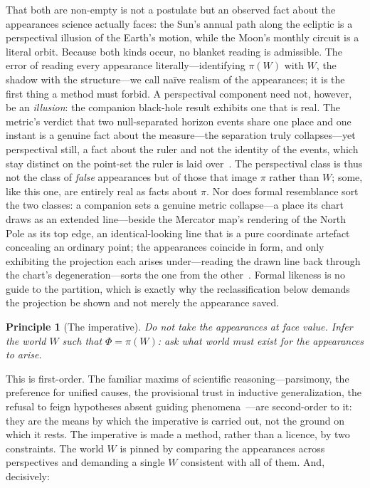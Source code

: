 \documentclass[11pt,a4paper]{article}
\newtheorem{principle}{Principle}
\begin{document}
\noindent That both are non-empty is not a postulate but an observed fact about the appearances science actually faces: the Sun's annual path along the ecliptic is a perspectival illusion of the Earth's motion, while the Moon's monthly circuit is a literal orbit. Because both kinds occur, no blanket reading is admissible. The error of reading every appearance literally---identifying $\pi(W)$ with $W$, the shadow with the structure---we call naïve realism of the appearances; it is the first thing a method must forbid. A perspectival component need not, however, be an \emph{illusion}: the companion black-hole result exhibits one that is real. The metric's verdict that two null-separated horizon events share one place and one instant is a genuine fact about the measure---the separation truly collapses---yet perspectival still, a fact about the ruler and not the identity of the events, which stay distinct on the point-set the ruler is laid over~\cite{JanzenBHcausality}. The perspectival class is thus not the class of \emph{false} appearances but of those that image $\pi$ rather than $W$; some, like this one, are entirely real as facts about $\pi$. Nor does formal resemblance sort the two classes: a companion sets a genuine metric collapse---a place its chart draws as an extended line---beside the Mercator map's rendering of the North Pole as its top edge, an identical-looking line that is a pure coordinate artefact concealing an ordinary point; the appearances coincide in form, and only exhibiting the projection each arises under---reading the drawn line back through the chart's degeneration---sorts the one from the other~\cite{JanzenCircle}. Formal likeness is no guide to the partition, which is exactly why the reclassification below demands the projection be shown and not merely the appearance saved.

\begin{principle}[The imperative]\label{prin:imperative}
Do not take the appearances at face value. Infer the world $W$ such that $\Phi=\pi(W)$: ask what world must exist for the appearances to arise.
\end{principle}

\noindent This is first-order. The familiar maxims of scientific reasoning---parsimony, the preference for unified causes, the provisional trust in inductive generalization, the refusal to feign hypotheses absent guiding phenomena~\cite{NewtonPrincipia}---are second-order to it: they are the means by which the imperative is carried out, not the ground on which it rests. The imperative is made a method, rather than a licence, by two constraints. The world $W$ is pinned by comparing the appearances across perspectives and demanding a single $W$ consistent with all of them. And, decisively:
\end{document}

